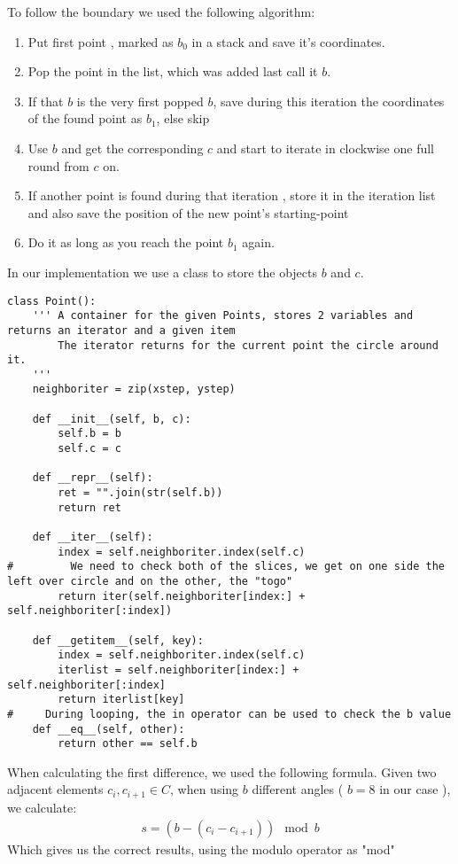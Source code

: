 To follow the boundary we used the following algorithm:
\begin{enumerate}
\item Put first point , marked as $b_0$ in a stack and save it's coordinates.
\item Pop the point in the list, which was added last call it $b$.
\item If that $b$ is the very first popped $b$, save during this iteration the coordinates of the found point as $b_1$, else skip
\item Use $b$ and get the corresponding $c$ and start to iterate in clockwise one full round from $c$ on.
\item If another point is found during that iteration , store it in the iteration list and also save the position of the new point's starting-point 
\item Do it as long as you reach the point $b_1$ again.
\end{enumerate}

In our implementation we use a class to store the objects $b$ and $c$.

\begin{verbatim}
class Point():
    ''' A container for the given Points, stores 2 variables and returns an iterator and a given item
        The iterator returns for the current point the circle around it.
    '''
    neighboriter = zip(xstep, ystep)
    
    def __init__(self, b, c):
        self.b = b
        self.c = c
        
    def __repr__(self):
        ret = "".join(str(self.b))
        return ret
    
    def __iter__(self):
        index = self.neighboriter.index(self.c)
#         We need to check both of the slices, we get on one side the left over circle and on the other, the "togo"
        return iter(self.neighboriter[index:] + self.neighboriter[:index])
    
    def __getitem__(self, key):
        index = self.neighboriter.index(self.c)
        iterlist = self.neighboriter[index:] + self.neighboriter[:index]
        return iterlist[key]
#     During looping, the in operator can be used to check the b value
    def __eq__(self, other):
        return other == self.b
\end{verbatim}


When calculating the first difference, we used the following formula.
Given two adjacent elements $c_i,c_{i+1} \in C$, when using $b$ different angles ( $b=8$ in our case ), we calculate:
\begin{gather*}
s = (b - ( c_i - c_{i+1} )) \mod b
\end{gather*}
Which gives us the correct results, using the modulo operator as "mod"


